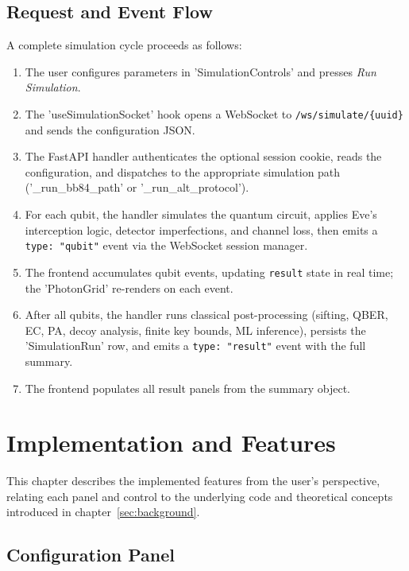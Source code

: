 \documentclass[12pt, a4paper]{article}
\begin{document}
\subsection{Request and Event Flow}
\label{sec:request-flow}

A complete simulation cycle proceeds as follows:

\begin{enumerate}
  \item The user configures parameters in 'SimulationControls' and
        presses \emph{Run Simulation}.
  \item The 'useSimulationSocket' hook opens a WebSocket to
        \texttt{/ws/simulate/\{uuid\}} and sends the configuration JSON.
  \item The FastAPI handler authenticates the optional session cookie,
        reads the configuration, and dispatches to the appropriate
        simulation path ('\_run\_bb84\_path' or
        '\_run\_alt\_protocol').
  \item For each qubit, the handler simulates the quantum circuit, applies
        Eve's interception logic, detector imperfections, and channel loss,
        then emits a \texttt{type: "qubit"} event via the WebSocket session
        manager.
  \item The frontend accumulates qubit events, updating \texttt{result}
        state in real time; the 'PhotonGrid' re-renders on each
        event.
  \item After all qubits, the handler runs classical post-processing
        (sifting, QBER, EC, PA, decoy analysis, finite key bounds, ML
        inference), persists the 'SimulationRun' row, and emits a
        \texttt{type: "result"} event with the full summary.
  \item The frontend populates all result panels from the summary object.
\end{enumerate}

\newpage
\section{Implementation and Features}
\label{sec:implementation}

This chapter describes the implemented features from the user's perspective,
relating each panel and control to the underlying code and theoretical
concepts introduced in chapter~\ref{sec:background}.

\subsection{Configuration Panel}
\label{sec:config-panel}
\end{document}
